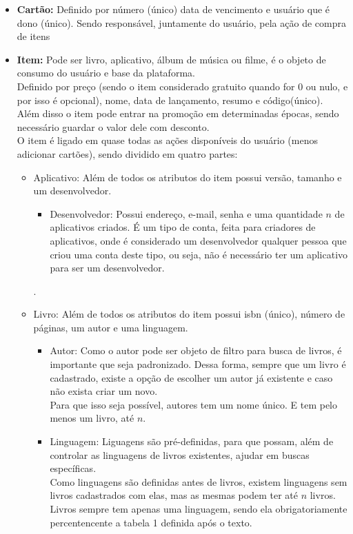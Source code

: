 \documentclass[a4paper, 11pt]{article}
\begin{document}
\begin{itemize}
\begin{itemize}
    \end{itemize}.
    \item \textbf{Cartão:} Definido por número (único) data de vencimento e usuário que é dono (único). Sendo responsável, juntamente do usuário, pela ação de compra de itens
    \item \textbf{Item:} Pode ser livro, aplicativo, álbum de música ou filme, é o objeto de consumo do usuário e base da plataforma.\\
    Definido por preço (sendo o item considerado gratuito quando for 0 ou nulo, e por isso é opcional), nome, data de lançamento, resumo e código(único). Além disso o item pode entrar na promoção em determinadas épocas, sendo necessário guardar o valor dele com desconto. \\
    O item é ligado em quase todas as ações disponíveis do usuário (menos adicionar cartões), sendo dividido em quatro partes:
    \begin{itemize}
        \item Aplicativo: Além de todos os atributos do item possui versão, tamanho e um desenvolvedor. 
         \begin{itemize}
            \item Desenvolvedor: Possui endereço, e-mail, senha e uma quantidade $n$ de aplicativos criados. É um tipo de conta, feita para criadores de aplicativos, onde é considerado um desenvolvedor qualquer pessoa que criou uma conta deste tipo, ou seja, não é necessário ter um aplicativo para ser um desenvolvedor.
         \end{itemize}.
        \item Livro: Além de todos os atributos do item possui isbn (único), número de páginas, um autor e uma linguagem.
        \begin{itemize}
            \item Autor: Como o autor pode ser objeto de filtro para busca de livros, é importante que seja padronizado. Dessa forma, sempre que um livro é cadastrado, existe a opção de escolher um autor já existente e caso não exista criar um novo.\\
            Para que isso seja possível, autores tem um nome único. E tem pelo menos um livro, até $n$.
            \item Linguagem: Liguagens são pré-definidas, para que possam, além de controlar as linguagens de livros existentes, ajudar em buscas específicas.\\
            Como linguagens são definidas antes de livros, existem linguagens sem livros cadastrados com elas, mas as mesmas podem ter até $n$ livros. Livros sempre tem apenas uma linguagem, sendo ela obrigatoriamente percentencente a tabela 1 definida após o texto.

\end{itemize}
\end{itemize}
\end{itemize}
\end{document}
